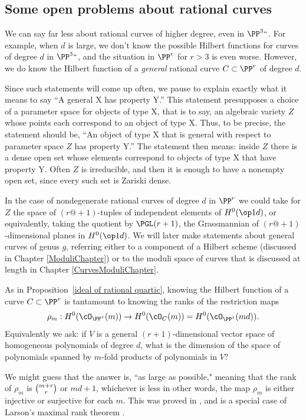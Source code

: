 \subsection*{Some open problems about rational curves}

We can say far less about rational curves of higher degree, even in $\PP^3` `$. For example, when $d$ is large, we
don't know the possible Hilbert functions for curves of degree $d$ in $\PP^3` `$, and the situation in $\PP^r$ for
$r>3$ is even worse. However, we do know the Hilbert function of a \emph{general} rational curve $C \subset \PP^r$ of degree $d$.

Since such statements will come up often, we pause to explain
exactly what it means to say
%
``A general X has property Y.'' This
statement presupposes a choice of a parameter space for objects of
type X,
that is to say, an algebraic variety $Z$ whose points each correspond to an object of type X. Thus, to be precise, the statement should be,
``An  object of type X that is general with respect to parameter space $Z$ has property Y.'' The statement then means: inside $Z$ there is
a dense open set whose elements correspond to objects of type X that have property Y. Often $Z$ is irreducible, and
then it is enough to have a nonempty open set, since every such set is Zariski dense.

In the case of nondegenerate rational curves
of degree $d$ in $\PP^{r}$
we could take for $Z$ the space of
$(r@{+}1)$-tuples of independent elements of $H^{0}(\op1d)$, or
equivalently, taking the quotient by $\PGL(r+1)$,
the
Grassmannian
%
 of $(r@{+}1)$-dimensional planes in $H^{0}(\op1d)$.
We will later make statements about general curves of genus $g$, referring either to
a component of a Hilbert scheme
(discussed in Chapter \ref{ModuliChapter}) or to the
moduli space of curves that is discussed at length in Chapter
\ref{CurvesModuliChapter}.

As in Proposition~\ref{ideal of rational quartic}, knowing the Hilbert function of a curve $C\subset \PP^{r}$ is tantamount to knowing the ranks of the restriction maps
$$
\rho_m : H^0(\cO_{\PP^r}(m)) \to H^0(\cO_C(m)) = H^0(\cO_{\PP^1}(md)).
$$
Equivalently we ask: if $V$ is a general  $(r+1)$-dimensional vector space of homogeneous polynomials of degree $d$, what is the dimension of the space of polynomials spanned by $m$-fold products of polynomials in $V$?

We might guess that the answer is, ``as large as possible," meaning
that the rank of $\rho_m$ is $\tbinom{m+r}{r}$ or $md+1$,
whichever is less
\emdash in
other words, the map $\rho_m$ is either injective or surjective for
each $m$. This was proved in \cite{Ballico-Ellia83}, and is a special
case of Larson's maximal rank theorem \cite{Larson}.

